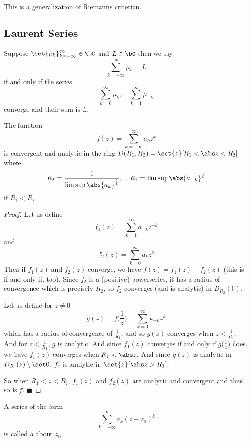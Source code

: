 \documentclass[10pt]{article}
\def\qed{\hskip1cm\hbox{}\hfill$\blacksquare$}
\begin{document}
This is a generalization of Riemanns criterion.

\subsection{Laurent Series}

\begin{defn*}

    Suppose $\set{\mu_k}_{k=-\infty}^\infty\in\bC$ and $L\in\bC$ then we say
    \[ \sum_{k=-\infty}^\infty\mu_k = L \]
    if and only if the series
    \[ \sum_{k=0}^\infty\mu_k,\quad\sum_{k=1}^\infty\mu_{-k} \]
    converge and their sum is $L$.

\end{defn*}

\newpage
\begin{thrm*}

    The function
    \[ f(z) = \sum_{k=-\infty}^\infty a_kz^k \]
    is convergent and analytic in the ring $D(R_1,R_2)=\set{z}[R_1<\abs z<R_2]$ where
    \[ R_2 = \frac1{\limsup\abs{a_k}^{\frac1k}},\quad R_1=\limsup\abs{a_{-k}}^{\frac1k} \]
    if $R_1<R_2$.

\end{thrm*}

\begin{proof}

    Let us define
    \[ f_1(z) = \sum_{k=1}^\infty a_{-k}z^{-k} \]
    and
    \[ f_2(z) = \sum_{k=0}^\infty a_kz^k \]
    Then if $f_1(z)$ and $f_2(z)$ converge, we have $f(z)=f_1(z)+f_2(z)$ (this is if and only if, too).
    Since $f_2$ is a (positive) powerseries, it has a radius of convergence which is precisely $R_2$, so $f_2$ converges (and is analytic) in $D_{R_2}(0)$.

    Let us define for $z\neq0$
    \[ g(z)=f\bigl(\frac1z\bigr) = \sum_{k=1}^\infty a_{-k}z^k \]
    which has a radius of convergence of $\frac1{R_1}$, and so $g(z)$ converges when $z<\frac1{R_1}$.
    And for $z<\frac1{R_1}$, $g$ is analytic.
    And since $f_1(z)$ converges if and only if $g\bigl(\frac1z\bigr)$ does, we have $f_1(z)$ converges when $R_1<\abs z$.
    And since $g(z)$ is analytic in $D_{R_1}(z)\setminus\set0$, $f_1$ is analytic in $\set{z}[\abs z>R_1]$.

    So when $R_1<z<R_2$, $f_1(z)$ and $f_2(z)$ are analytic and convergent and thus so is $f$.
    \qed

\end{proof}

\begin{defn*}

    A series of the form
    \[ \sum_{k=-\infty}^\infty a_k(z-z_0)^k \]
    is  called a  about $z_0$.

\end{defn*}
\end{document}
